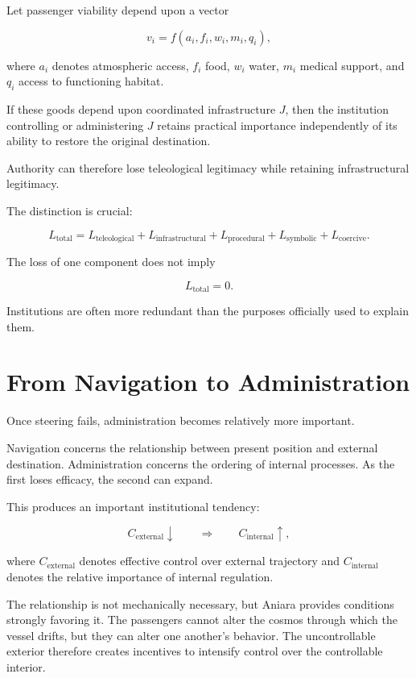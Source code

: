 \documentclass[11pt,oneside]{book}
\theoremstyle{definition}
\theoremstyle{remark}
\begin{document}
Let passenger viability depend upon a vector

\[
v_i
=
f(
a_i,
f_i,
w_i,
m_i,
q_i
),
\]

where \(a_i\) denotes atmospheric access, \(f_i\) food, \(w_i\) water, \(m_i\) medical support, and \(q_i\) access to functioning habitat.

If these goods depend upon coordinated infrastructure \(J\), then the institution controlling or administering \(J\) retains practical importance independently of its ability to restore the original destination.

Authority can therefore lose teleological legitimacy while retaining infrastructural legitimacy.

The distinction is crucial:

\[
L_{\mathrm{total}}
=
L_{\mathrm{teleological}}
+
L_{\mathrm{infrastructural}}
+
L_{\mathrm{procedural}}
+
L_{\mathrm{symbolic}}
+
L_{\mathrm{coercive}}.
\]

The loss of one component does not imply

\[
L_{\mathrm{total}}=0.
\]

Institutions are often more redundant than the purposes officially used to explain them.

\section{From Navigation to Administration}

Once steering fails, administration becomes relatively more important.

Navigation concerns the relationship between present position and external destination. Administration concerns the ordering of internal processes. As the first loses efficacy, the second can expand.

This produces an important institutional tendency:

\[
C_{\mathrm{external}}\downarrow
\qquad\Longrightarrow\qquad
C_{\mathrm{internal}}\uparrow,
\]

where \(C_{\mathrm{external}}\) denotes effective control over external trajectory and \(C_{\mathrm{internal}}\) denotes the relative importance of internal regulation.

The relationship is not mechanically necessary, but Aniara provides conditions strongly favoring it. The passengers cannot alter the cosmos through which the vessel drifts, but they can alter one another's behavior. The uncontrollable exterior therefore creates incentives to intensify control over the controllable interior.
\end{document}
